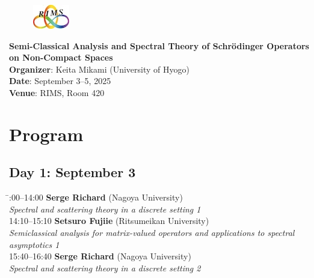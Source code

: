 \documentclass[a4paper,11pt]{article}
\numberwithin{equation}{section}
\begin{document}
\pagestyle{empty}



\begin{figure}
  \centering
  \includegraphics[bb=0 0 0.2 0.15]{mugenRIMS2.jpg}
\end{figure}

\begin{center}
{\fontsize{15.5pt}{18pt}\selectfont \bfseries Semi-Classical Analysis and Spectral Theory of Schrödinger Operators on Non-Compact Spaces}\\
  \textbf{Organizer}:  Keita Mikami (University of Hyogo)\\
  \textbf{Date}: September 3--5, 2025\\
  \textbf{Venue}: RIMS, Room 420
\end{center}

\section*{Program}

\subsection*{Day 1: September 3}
\begin{tabbing}
  \hspace{3cm}\=:00--14:00 \> \textbf{Serge Richard}  (Nagoya University)\\
                \> \emph{Spectral and scattering theory in a discrete setting 1}\\

  14:10--15:10 \> \textbf{Setsuro Fujiie}  (Ritsumeikan University)\\
                \> \emph{Semiclassical analysis for matrix-valued operators
and applications to spectral}\\
               \> \emph{ asymptotics 1}\\

  15:40--16:40 \> \textbf{Serge Richard}  (Nagoya University)\\
                \> \emph{Spectral and scattering theory in a discrete setting 2}
\end{tabbing}
\end{document}
